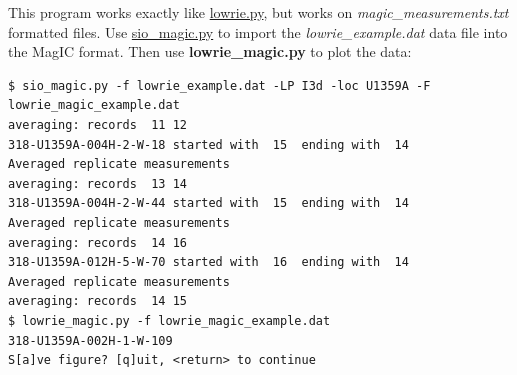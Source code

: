 \documentclass[11pt]{book}
\begin{document}
{{This program works exactly like \href{#lowrie.py}{lowrie.py}, but works on {\it magic\_measurements.txt} formatted files.  Use \href{#sio_magic.py}{sio\_magic.py} to import the {\it lowrie\_example.dat} data file into the MagIC format.  Then use {\bf lowrie\_magic.py} to plot the data:

\begin{verbatim}
$ sio_magic.py -f lowrie_example.dat -LP I3d -loc U1359A -F lowrie_magic_example.dat
averaging: records  11 12
318-U1359A-004H-2-W-18 started with  15  ending with  14
Averaged replicate measurements
averaging: records  13 14
318-U1359A-004H-2-W-44 started with  15  ending with  14
Averaged replicate measurements
averaging: records  14 16
318-U1359A-012H-5-W-70 started with  16  ending with  14
Averaged replicate measurements
averaging: records  14 15
$ lowrie_magic.py -f lowrie_magic_example.dat
318-U1359A-002H-1-W-109
S[a]ve figure? [q]uit, <return> to continue
\end{verbatim}


}}
\end{document}
